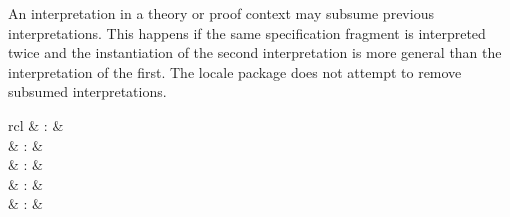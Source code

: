 \begin{isabellebody}
\begin{isamarkuptext}
  \begin{warn}
    An interpretation in a theory or proof context may subsume previous
    interpretations.  This happens if the same specification fragment
    is interpreted twice and the instantiation of the second
    interpretation is more general than the interpretation of the
    first.  The locale package does not attempt to remove subsumed
    interpretations.
  \end{warn}%
\end{isamarkuptext}%
\isamarkuptrue%
%
\isamarkuptrue%
%
\begin{isamarkuptext}%
\begin{matharray}{rcl}
    \hypertarget{command.class}{\hyperlink{command.class}{\mbox{}}} & : &  \\
    \hypertarget{command.instantiation}{\hyperlink{command.instantiation}{\mbox{}}} & : &  \\
    \hypertarget{command.instance}{\hyperlink{command.instance}{\mbox{}}} & : &  \\
    \hyperlink{command.instance}{\mbox{}} & : &  \\
    \hypertarget{command.subclass}{\hyperlink{command.subclass}{\mbox{}}} & : &  \\

\end{matharray}
\end{isamarkuptext}
\end{isabellebody}
